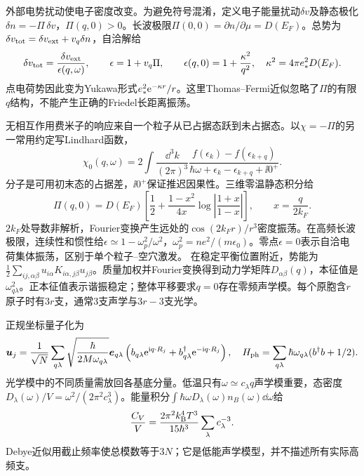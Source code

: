 \label{ch:phonon}
外部电势扰动使电子密度改变。为避免符号混淆，定义电子能量扰动$\delta v$及静态极化$\delta n=-\Pi\,\delta v$，$\Pi(q,0)>0$。长波极限$\Pi(0,0)=\partial n/\partial\mu=D(E_F)$。总势为$\delta v_{\rm tot}=\delta v_{\rm ext}+v_q\delta n$，自洽解给
\begin{equation}
\delta v_{\rm tot}=\frac{\delta v_{\rm ext}}{\epsilon(q,\omega)},\qquad \epsilon=1+v_q\Pi,\qquad \epsilon(q,0)=1+\frac{\kappa^2}{q^2},\quad\kappa^2=4\pi e_*^2D(E_F).
\end{equation}
点电荷势因此变为Yukawa形式$e_*^2\mathrm e^{-\kappa r}/r$。这里Thomas--Fermi近似忽略了$\Pi$的有限$q$结构，不能产生正确的Friedel长距离振荡。

无相互作用费米子的响应来自一个粒子从已占据态跃到未占据态。以$\chi=-\Pi$的另一常用约定写Lindhard函数，
\begin{equation}
\chi_0(q,\omega)=2\int\frac{\dd^3k}{(2\pi)^3}\frac{f(\epsilon_k)-f(\epsilon_{k+q})}{\hbar\omega+\epsilon_k-\epsilon_{k+q}+\ii0^+}.
\end{equation}
分子是可用初末态的占据差，$\ii0^+$保证推迟因果性。三维零温静态积分给
\begin{equation}
\Pi(q,0)=D(E_F)\left[\frac12+\frac{1-x^2}{4x}\log\left|\frac{1+x}{1-x}\right|\right],\qquad x=\frac q{2k_F}.
\end{equation}
$2k_F$处导数非解析，Fourier变换产生远处的$\cos(2k_Fr)/r^3$密度振荡。在高频长波极限，连续性和惯性给$\epsilon\simeq1-\omega_p^2/\omega^2$，$\omega_p^2=ne^2/(m\epsilon_0)$。零点$\epsilon=0$表示自洽电荷集体振荡，区别于单个粒子--空穴激发。
在稳定平衡位置附近，势能为$\frac12\sum_{ij,\alpha\beta}u_{i\alpha}K_{i\alpha,j\beta}u_{j\beta}$。质量加权并Fourier变换得到动力学矩阵$D_{\alpha\beta}(q)$，本征值是$\omega_{q\lambda}^2$。正本征值表示谐振稳定；整体平移要求$q=0$存在零频声学模。每个原胞含$r$原子时有$3r$支，通常3支声学与$3r-3$支光学。

正规坐标量子化为
\begin{equation}
\boldsymbol{u}_j=\frac1{\sqrt N}\sum_{q\lambda}\sqrt{\frac{\hbar}{2M\omega_{q\lambda}}}\boldsymbol{e}_{q\lambda}\left(b_{q\lambda}\mathrm e^{\mathrm i q\cdot R_j}+b_{q\lambda}^\dagger\mathrm e^{-\mathrm i q\cdot R_j}\right),\quad H_{\rm ph}=\sum_{q\lambda}\hbar\omega_{q\lambda}(b^\dagger b+1/2).
\end{equation}
光学模中的不同质量需放回各基底分量。低温只有$\omega\simeq c_\lambda q$声学模重要，态密度$D_\lambda(\omega)/V=\omega^2/(2\pi^2c_\lambda^3)$。能量积分$\int\hbar\omega D_\lambda(\omega)n_B(\omega)\dd\omega$给
\begin{equation}
\frac{C_V}{V}=\frac{2\pi^2k_{\mathrm B}^4T^3}{15\hbar^3}\sum_\lambda c_\lambda^{-3}.
\end{equation}
Debye近似用截止频率使总模数等于$3N$；它是低能声学模型，并不描述所有实际高频支。

